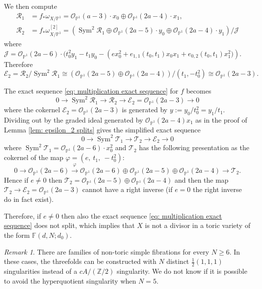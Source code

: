 \documentclass[a4paper,11pt]{amsart}
\newcommand{\E}{\ensuremath{\mathcal{E}}}
\newcommand{\FF}{\ensuremath{\mathbb{F}}}
\newcommand{\PP}{\ensuremath{\mathbb{P}}}
\DeclareMathOperator{\Sym}{Sym}
\theoremstyle{definition}
\theoremstyle{remark}
\newtheorem{remark}[thm]{Remark}
\numberwithin{equation}{section}
\begin{document}
We then compute
\begin{align*}
	\mathcal{R}_1 & = f_* \omega_{X/\PP^1} = \mathcal{O}_{\PP^1}(a-3)\cdot x_0\oplus\mathcal{O}_{\PP^1}(2a-4)\cdot x_1, \\
	\mathcal{R}_2 & = f_* \omega_{X/\PP^1}^{[2]} = {\left(\Sym^2\mathcal{R}_1 \oplus \mathcal{O}_{\PP^1}(2a-5)\cdot y_0\oplus \mathcal{O}_{\PP^1}(2a-4)\cdot y_1\right)} / \mathcal{J}
\end{align*}
where $\mathcal{J}=\mathcal{O}_{\PP^1}(2a-6)\cdot(t_0^2y_1 - t_1y_0 - \left( ex_0^2+e_{1,1}(t_0,t_1)x_0x_1+e_{0,2}(t_0,t_1)x_1^2) \right)$. Therefore  
\[
\mathcal{E}_2=\mathcal{R}_2/\Sym^2\mathcal{R}_1  \cong {(\mathcal{O}_{\PP^1}(2a-5)\oplus\mathcal{O}_{\PP^1}(2a-4))} / {(t_1,-t_0^2)} \cong \mathcal{O}_{\PP^1}(2a-3).
\]

The exact sequence \eqref{eq: multiplication exact sequence} for $f$ becomes
\begin{equation*}
	0 \to \Sym^2\mathcal{R}_1 \to \mathcal{R}_2 \to \mathcal{E}_2={\mathcal{O}_{\PP^1}(2a-3)} \to 0
\end{equation*}
where the cokernel $\mathcal{E}_2=\mathcal{O}_{\PP^1}(2a-3)$ is generated by $y:=y_0/t_0^2=y_1/t_1$.
Dividing out by the graded ideal generated by $\mathcal{O}_{\mathbb{P}^1}(2a-4)x_1$ as in the proof of Lemma \ref{lem: epsilon_2 splits} gives the simplified exact sequence
\[0\to\Sym^2\mathcal{T}_1\to\mathcal{T}_2\to\E_2\to0\]
where $\Sym^2\mathcal{T}_1=\mathcal{O}_{\mathbb{P}^1}(2a-6)\cdot x_0^2$ and $\mathcal{T}_2$ has the following presentation as the cokernel of the map 
$\varphi=\left(e,\ t_1,\ -t_0^2\right)$:
\[0\to\mathcal{O}_{\mathbb{P}^1}(2a-6) \xrightarrow{\varphi} 
\mathcal{O}_{\mathbb{P}^1}(2a-6)\oplus
\mathcal{O}_{\mathbb{P}^1}(2a-5)\oplus
\mathcal{O}_{\mathbb{P}^1}(2a-4) \to \mathcal{T}_2.\]
Hence if $e\ne0$ then $\mathcal{T}_2=\mathcal{O}_{\mathbb{P}^1}(2a-5)\oplus
\mathcal{O}_{\mathbb{P}^1}(2a-4)$ and then the map $\mathcal{T}_2\to\E_2 =\mathcal{O}_{\PP^1}(2a-3)$ cannot have a right inverse (if $e=0$ the right inverse do in fact exist).

Therefore, if $e\ne0$ then also the exact sequence \eqref{eq: multiplication exact sequence} does not split, which implies that $X$ is not a divisor in a toric variety of the form $\FF(d, N; d_0)$. 

\begin{remark}
    There are families of non-toric simple fibrations for every $N\ge6$. In these cases, the threefolds can be constructed with $N$ distinct $\frac12(1,1,1)$ singularities instead of a $cA/(\mathbb{Z}/2)$ singularity. We do not know if it is possible to avoid the hyperquotient singularity when $N=5$.
\end{remark}
\end{document}
